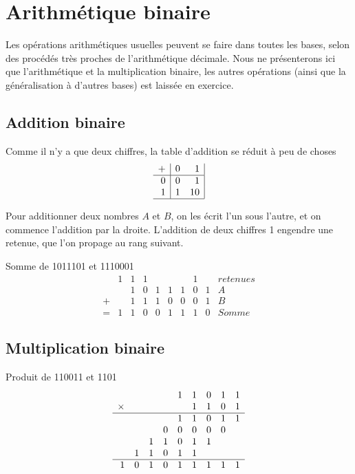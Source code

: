 \section{Arithm\'etique binaire}

Les op\'erations arithm\'etiques usuelles 
peuvent se faire dans toutes les bases, selon des proc\'ed\'es
tr\`es proches de l'arithm\'etique d\'ecimale.  Nous ne pr\'esenterons ici que
l'arithm\'etique et la multiplication binaire, les autres op\'erations (ainsi
que la g\'en\'eralisation \`a d'autres bases) est
laiss\'ee en exercice.

\subsection{Addition binaire}
Comme il n'y a que deux chiffres, la table d'addition se r\'eduit \`a peu de choses
$$\begin{array}{r|rr|}
+ &0 &1 \\
\hline
0 &0 &1 \\
1 &1 &10 \\
\hline
\end{array} $$

Pour additionner deux nombres $A$ et $B$, on les \'ecrit l'un sous l'autre, 
et on commence
l'addition par la droite. L'addition de deux chiffres 1 engendre une retenue, 
que l'on propage au rang suivant. 

\begin{exemple}{Somme de 1011101 et 1110001}
$$\begin{array}{rrrrrrrrrl}
&1 & 1 & 1 &   &   &   & 1 &   & retenues \\
&  & 1 & 0 & 1 & 1 & 1 & 0 & 1 & A \\
+&  & 1 & 1 & 1 & 0 & 0 & 0 & 1 & B \\
\hline
= &1 & 1 & 0 & 0 & 1 & 1 & 1 & 0 & Somme
\end{array} $$
\end{exemple}

%

\subsection{Multiplication binaire}

\begin{exemple}{Produit de 110011 et 1101}
$$\begin{array}{rrrrrrrrrr}
 & & & &1&1&0&1&1 \\
\times & & & & &1&1&0&1 \\
\hline
 & & & &1&1&0&1&1 \\
 & & &0&0&0&0&0& \\
 & &1&1&0&1&1& & \\
 &1&1&0&1&1& \\
\hline
1&0&1&0&1&1&1&1&1
\end{array} $$
\end{exemple}

